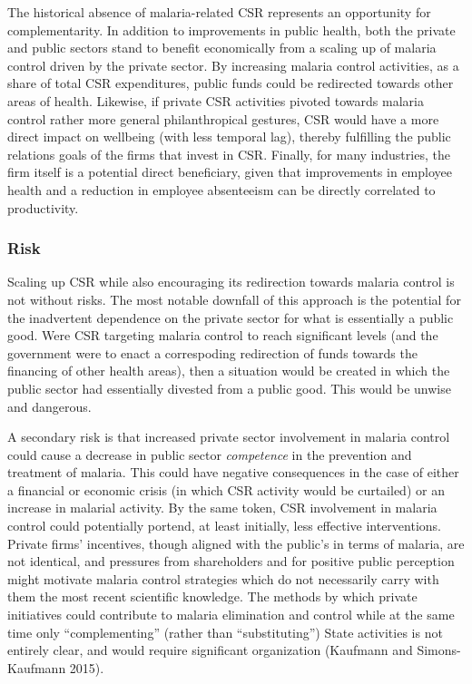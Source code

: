 \documentclass[]{article}
\begin{document}
The historical absence of malaria-related CSR represents an opportunity
for complementarity. In addition to improvements in public health, both
the private and public sectors stand to benefit economically from a
scaling up of malaria control driven by the private sector. By
increasing malaria control activities, as a share of total CSR
expenditures, public funds could be redirected towards other areas of
health. Likewise, if private CSR activities pivoted towards malaria
control rather more general philanthropical gestures, CSR would have a
more direct impact on wellbeing (with less temporal lag), thereby
fulfilling the public relations goals of the firms that invest in CSR.
Finally, for many industries, the firm itself is a potential direct
beneficiary, given that improvements in employee health and a reduction
in employee absenteeism can be directly correlated to productivity.

\subsubsection{Risk}\label{risk}

Scaling up CSR while also encouraging its redirection towards malaria
control is not without risks. The most notable downfall of this approach
is the potential for the inadvertent dependence on the private sector
for what is essentially a public good. Were CSR targeting malaria
control to reach significant levels (and the government were to enact a
correspoding redirection of funds towards the financing of other health
areas), then a situation would be created in which the public sector had
essentially divested from a public good. This would be unwise and
dangerous.

A secondary risk is that increased private sector involvement in malaria
control could cause a decrease in public sector \emph{competence} in the
prevention and treatment of malaria. This could have negative
consequences in the case of either a financial or economic crisis (in
which CSR activity would be curtailed) or an increase in malarial
activity. By the same token, CSR involvement in malaria control could
potentially portend, at least initially, less effective interventions.
Private firms' incentives, though aligned with the public's in terms of
malaria, are not identical, and pressures from shareholders and for
positive public perception might motivate malaria control strategies
which do not necessarily carry with them the most recent scientific
knowledge. The methods by which private initiatives could contribute to
malaria elimination and control while at the same time only
``complementing'' (rather than ``substituting'') State activities is not
entirely clear, and would require significant organization (Kaufmann and
Simons-Kaufmann 2015).
\end{document}
